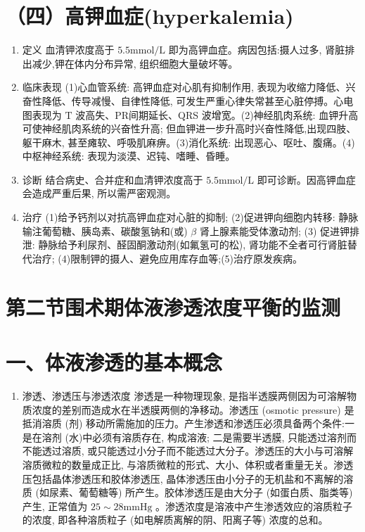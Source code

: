 \documentclass[10pt]{article}
\begin{document}
\section*{（四）高钾血症(hyperkalemia)}
\begin{enumerate}
  \item 定义 血清钾浓度高于 $5.5 \mathrm{mmol} / \mathrm{L}$ 即为高钾血症。病因包括:摄人过多, 肾脏排出减少,钾在体内分布异常, 组织细胞大量破坏等。

  \item 临床表现 (1)心血管系统: 高钾血症对心肌有抑制作用, 表现为收缩力降低、兴奋性降低、传导减慢、自律性降低, 可发生严重心律失常甚至心脏停搏。心电图表现为 $\mathrm{T}$ 波高失、PR间期延长、QRS 波增宽。(2)神经肌肉系统: 血钾升高可使神经肌肉系统的兴奋性升高; 但血钾进一步升高时兴奋性降低,出现四肢、躯干麻木, 甚至瘫软、呼吸肌麻痹。(3)消化系统: 出现恶心、呕吐、腹痛。(4)中枢神经系统: 表现为淡漠、迟钝、嗜睡、昏睡。

  \item 诊断 结合病史、合并症和血清钾浓度高于 $5.5 \mathrm{mmol} / \mathrm{L}$ 即可诊断。因高钾血症会造成严重后果, 所以需严密观测。

  \item 治疗 (1)给予钙剂以对抗高钾血症对心脏的抑制; (2)促进钾向细胞内转移: 静脉输注葡萄糖、胰岛素、碳酸氢钠和(或) $\beta$ 肾上腺素能受体激动剂; (3) 促进钾排泄: 静脉给予利尿剂、醛固酮激动剂(如氟氢可的松), 肾功能不全者可行肾脏替代治疗; (4)限制钾的摄人、避免应用库存血等;(5)治疗原发疾病。

\end{enumerate}

\section*{第二节围术期体液渗透浓度平衡的监测}
\section*{一、体液渗透的基本概念}
\begin{enumerate}
  \item 渗透、渗透压与渗透浓度 渗透是一种物理现象, 是指半透膜两侧因为可溶解物质浓度的差别而造成水在半透膜两侧的净移动。渗透压 (osmotic pressure) 是抵消溶质 (剂) 移动所需施加的压力。产生渗透和渗透压必须具备两个条件:一是在溶剂 (水)中必须有溶质存在, 构成溶液; 二是需要半透膜, 只能透过溶剂而不能透过溶质, 或只能透过小分子而不能透过大分子。渗透压的大小与可溶解溶质微粒的数量成正比, 与溶质微粒的形式、大小、体积或者重量无关。渗透压包括晶体渗透压和胶体渗透压, 晶体渗透压由小分子的无机盐和不离解的溶质 (如尿素、葡萄糖等) 所产生。胶体渗透压是由大分子 (如蛋白质、脂类等) 产生, 正常值为 $25 \sim 28 \mathrm{mmHg}$ 。渗透浓度是溶液中产生渗透效应的溶质粒子的浓度, 即各种溶质粒子 (如电解质离解的阴、阳离子等) 浓度的总和。
\end{enumerate}
\end{document}
